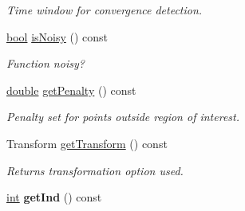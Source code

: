 \begin{DoxyCompactItemize}
\begin{DoxyCompactList}\small\item\em Time window for convergence detection. \end{DoxyCompactList}\item 
\hyperlink{classbool}{bool} \hyperlink{classCOCOfunc_aebf2679b94c68a5dd00bfbe2e65ae03c}{is\+Noisy} () const\hypertarget{classCOCOfunc_aebf2679b94c68a5dd00bfbe2e65ae03c}{}\label{classCOCOfunc_aebf2679b94c68a5dd00bfbe2e65ae03c}

\begin{DoxyCompactList}\small\item\em Function noisy? \end{DoxyCompactList}\item 
\hyperlink{classdouble}{double} \hyperlink{classCOCOfunc_a1bca22ed36ffb8b1e1a3c3ba6d28474a}{get\+Penalty} () const\hypertarget{classCOCOfunc_a1bca22ed36ffb8b1e1a3c3ba6d28474a}{}\label{classCOCOfunc_a1bca22ed36ffb8b1e1a3c3ba6d28474a}

\begin{DoxyCompactList}\small\item\em Penalty set for points outside region of interest. \end{DoxyCompactList}\item 
Transform \hyperlink{classCOCOfunc_a45ba191b9c22159ef160c56b7bb84e47}{get\+Transform} () const\hypertarget{classCOCOfunc_a45ba191b9c22159ef160c56b7bb84e47}{}\label{classCOCOfunc_a45ba191b9c22159ef160c56b7bb84e47}

\begin{DoxyCompactList}\small\item\em Returns transformation option used. \end{DoxyCompactList}\item 
\hyperlink{classint}{int} {\bfseries get\+Ind} () const\hypertarget{classCOCOfunc_adcc87a3ee718a74a2fbb715501a2592e}{}\label{classCOCOfunc_adcc87a3ee718a74a2fbb715501a2592e}


\end{DoxyCompactItemize}

